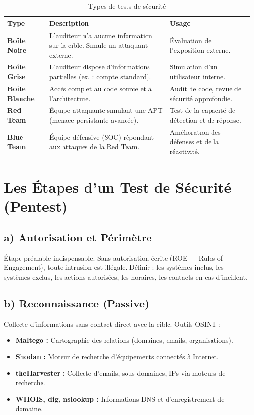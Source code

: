 \begin{table}[H]
\centering
\small
\begin{tabular}{p{3cm}p{5.5cm}p{4cm}}
    \toprule
    \textbf{Type} & \textbf{Description} & \textbf{Usage} \\
    \midrule
    \textbf{Boîte Noire} & L'auditeur n'a aucune information sur la cible. Simule un attaquant externe. & Évaluation de l'exposition externe. \\
    \textbf{Boîte Grise}  & L'auditeur dispose d'informations partielles (ex. : compte standard). & Simulation d'un utilisateur interne. \\
    \textbf{Boîte Blanche} & Accès complet au code source et à l'architecture. & Audit de code, revue de sécurité approfondie. \\
    \textbf{Red Team}     & Équipe attaquante simulant une APT (menace persistante avancée). & Test de la capacité de détection et de réponse. \\
    \textbf{Blue Team}    & Équipe défensive (SOC) répondant aux attaques de la Red Team. & Amélioration des défenses et de la réactivité. \\
    \bottomrule
\end{tabular}
\caption{Types de tests de sécurité}
\end{table}

\section{Les Étapes d'un Test de Sécurité (Pentest)}

\subsection{a) Autorisation et Périmètre}
Étape préalable indispensable. Sans autorisation écrite (ROE — Rules of Engagement), toute intrusion est illégale. Définir : les systèmes inclus, les systèmes exclus, les actions autorisées, les horaires, les contacts en cas d'incident.

\subsection{b) Reconnaissance (Passive)}
Collecte d'informations sans contact direct avec la cible. Outils OSINT :
\begin{itemize}
    \item \textbf{Maltego :} Cartographie des relations (domaines, emails, organisations).
    \item \textbf{Shodan :} Moteur de recherche d'équipements connectés à Internet.
    \item \textbf{theHarvester :} Collecte d'emails, sous-domaines, IPs via moteurs de recherche.
    \item \textbf{WHOIS, dig, nslookup :} Informations DNS et d'enregistrement de domaine.
\end{itemize}

